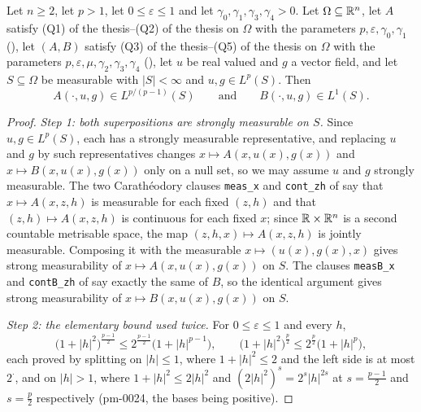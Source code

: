 \begin{lemma}
Let $n\ge2$, let $p>1$, let $0\le\varepsilon\le1$ and let
$\gamma_0,\gamma_1,\gamma_3,\gamma_4>0$.  Let $\Omega\subseteq\mathbb{R}^n$, let $A$
satisfy (Q1) of the thesis--(Q2) of the thesis on $\Omega$ with the parameters
$p,\varepsilon,\gamma_0,\gamma_1$ (), let $(A,B)$
satisfy (Q3) of the thesis--(Q5) of the thesis on $\Omega$ with the parameters
$p,\varepsilon,\mu,\gamma_2,\gamma_3,\gamma_4$
(), let $u$ be real valued and $g$ a vector
field, and let $S\subseteq\Omega$ be measurable with $|S|<\infty$ and
$u,g\in L^p(S)$.  Then
\[
A(\cdot,u,g)\in L^{p/(p-1)}(S)
\qquad\text{and}\qquad
B(\cdot,u,g)\in L^1(S).
\]
\end{lemma}
\begin{proof}
\emph{Step 1: both superpositions are strongly measurable on $S$.}  Since
$u,g\in L^p(S)$, each has a strongly measurable representative, and replacing
$u$ and $g$ by such representatives changes $x\mapsto A(x,u(x),g(x))$ and
$x\mapsto B(x,u(x),g(x))$ only on a null set, so we may assume $u$ and $g$
strongly measurable.  The two Carath\'eodory clauses \texttt{meas\_x} and
\texttt{cont\_zh} of  say that
$x\mapsto A(x,z,h)$ is measurable for each fixed $(z,h)$ and that
$(z,h)\mapsto A(x,z,h)$ is continuous for each fixed $x$; since
$\mathbb{R}\times\mathbb{R}^n$ is a second countable metrisable space, the map
$(z,h,x)\mapsto A(x,z,h)$ is jointly measurable.  Composing it with the
measurable $x\mapsto(u(x),g(x),x)$ gives strong measurability of
$x\mapsto A(x,u(x),g(x))$ on $S$.  The clauses \texttt{measB\_x} and
\texttt{contB\_zh} of  say exactly the same of
$B$, so the identical argument gives strong measurability of
$x\mapsto B(x,u(x),g(x))$ on $S$.

\emph{Step 2: the elementary bound used twice.}  For $0\le\varepsilon\le1$ and
every $h$,
\[
\bigl(1+|h|^2\bigr)^{\frac{p-1}2}\le2^{\frac{p-1}2}\bigl(1+|h|^{p-1}\bigr),
\qquad
\bigl(1+|h|^2\bigr)^{\frac p2}\le2^{\frac p2}\bigl(1+|h|^{p}\bigr),
\]
each proved by splitting on $|h|\le1$, where $1+|h|^2\le2$ and the left side is
at most $2^{\cdot}$, and on $|h|>1$, where $1+|h|^2\le2|h|^2$ and
$(2|h|^2)^{s}=2^{s}|h|^{2s}$ at $s=\frac{p-1}2$ and $s=\frac p2$
respectively (pm-0024, the bases being positive).


\end{proof}
